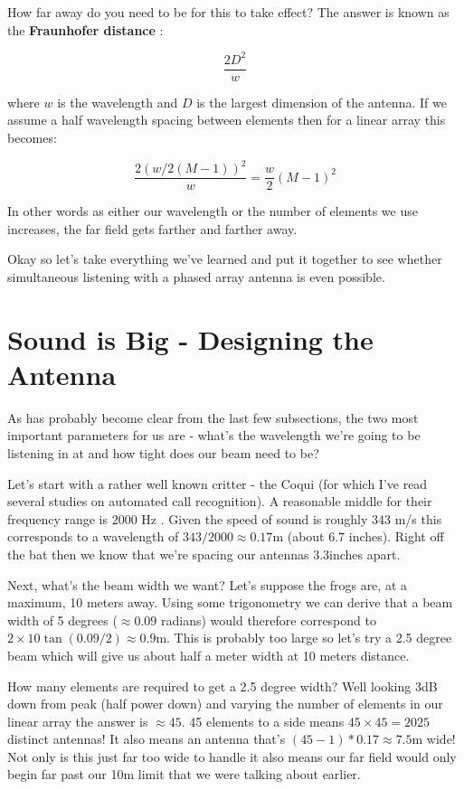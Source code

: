 \documentclass[10pt,a5paper]{book}
\begin{document}
How far away do you need to be for this to take effect? The answer is known as the \textbf{Fraunhofer distance} \cite{wikifarfield}:

\begin{equation}
\frac{2D^2}{w}
\end{equation}

where $w$ is the wavelength and $D$ is the largest dimension of the antenna. If we assume a half wavelength spacing between elements then for a linear array this becomes:

 
\begin{equation}
\frac{2(w/2(M-1))^2}{w}=\frac{w}{2}(M-1)^2
\end{equation}

In other words as either our wavelength or the number of elements we use increases, the far field gets farther and farther away. 

Okay so let's take everything we've learned and put it together to see whether simultaneous listening with a phased array antenna is even possible. 

\section{Sound is Big - Designing the Antenna}

As has probably become clear from the last few subsections, the two most important parameters for us are - what's the wavelength we're going to be listening in at and how tight does our beam need to be? 

Let's start with a rather well known critter - the Coqui (for which I've read several studies on automated call recognition). A reasonable middle for their frequency range is 2000 Hz \cite{mlcoqui}. Given the speed of sound is roughly 343 m/s this corresponds to a wavelength of $343/2000\approx 0.17$m (about 6.7 inches). Right off the bat then we know that we're spacing our antennas $3.3$inches apart. 

Next, what's the beam width we want? Let's suppose the frogs are, at a maximum, 10 meters away. Using some trigonometry we can derive that a beam width of 5 degrees ($\approx 0.09$ radians) would therefore correspond to $2\times 10 \tan(0.09/2)\approx0.9$m. This is probably too large so let's try a 2.5 degree beam which will give us about half a meter width at 10 meters distance. 

How many elements are required to get a 2.5 degree width? Well looking 3dB down from peak (half power down) and varying the number of elements in our linear array the answer is $\approx 45$. 45 elements to a side means $45\times45=2025$ distinct antennas! It also means an antenna that's $(45-1)*0.17\approx 7.5$m wide! Not only is this just far too wide to handle it also means our far field would only begin far past our 10m limit that we were talking about earlier. 
\end{document}
